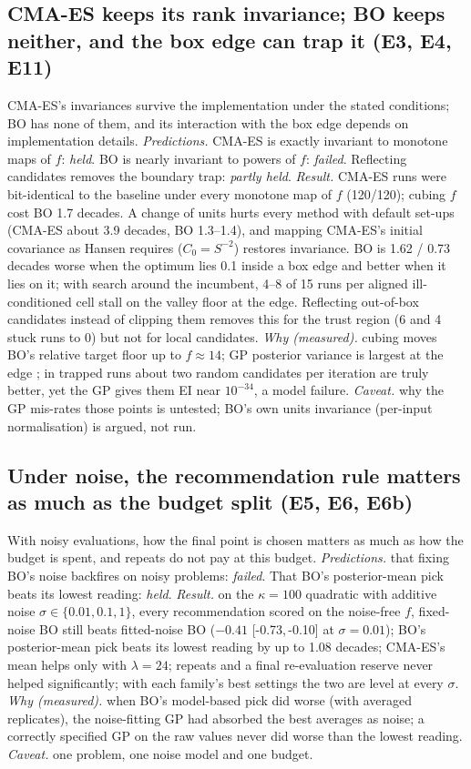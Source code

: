 \documentclass[10pt,a4paper]{article}
\newcommand{\ci}[2]{[#1,\,#2]}
\begin{document}
\subsection{CMA-ES keeps its rank invariance; BO keeps neither, and the box edge can trap it (E3, E4, E11)}
CMA-ES's invariances survive the implementation under the stated conditions; BO has none of them, and its interaction with
the box edge depends on implementation details. \textit{Predictions.} CMA-ES is exactly invariant to monotone maps of
$f$: \emph{held}. BO is nearly invariant to powers of $f$: \emph{failed}. Reflecting candidates removes the boundary trap:
\emph{partly held}. \textit{Result.} CMA-ES runs were bit-identical to the baseline under every monotone map of $f$
(120/120); cubing $f$ cost BO 1.7 decades. A change of units hurts every method with default set-ups (CMA-ES about 3.9 decades, BO
1.3--1.4), and mapping CMA-ES's initial covariance as Hansen requires ($C_0=S^{-2}$) restores invariance. BO is 1.62 / 0.73
decades worse when the optimum lies 0.1 inside a box edge and better when it lies on it; with search around the incumbent, 4--8 of
15 runs per aligned ill-conditioned cell stall on the valley floor at the edge. Reflecting out-of-box candidates instead of clipping
them removes this for the trust region (6 and 4 stuck runs to 0) but not for local candidates. \textit{Why (measured).} cubing
moves BO's relative target floor up to $f\approx14$; GP posterior variance is largest at the edge \citep{siivola2018boundary}; in
trapped runs about two random candidates per iteration are truly better, yet the GP gives them EI near $10^{-34}$, a model failure.
\textit{Caveat.} why the GP mis-rates those points is untested; BO's own units invariance (per-input normalisation) is
argued, not run.

\subsection{Under noise, the recommendation rule matters as much as the budget split (E5, E6, E6b)}
With noisy evaluations, how the final point is chosen matters as much as how the budget is spent, and repeats do not pay at this
budget. \textit{Predictions.} that fixing BO's noise backfires on noisy problems: \emph{failed}. That BO's
posterior-mean pick beats its lowest reading: \emph{held}. \textit{Result.} on the $\kappa=100$ quadratic with additive
noise $\sigma\in\{0.01,0.1,1\}$, every recommendation scored on the noise-free $f$, fixed-noise BO still beats fitted-noise BO
($-0.41$ \ci{-0.73}{-0.10} at $\sigma=0.01$); BO's posterior-mean pick beats its lowest reading by up to 1.08 decades; CMA-ES's mean
helps only with $\lambda=24$; repeats and a final re-evaluation reserve never helped significantly; with each family's best
settings the two are level at every $\sigma$. \textit{Why (measured).} when BO's model-based pick did worse (with averaged
replicates), the noise-fitting GP had absorbed the best averages as noise; a correctly specified GP on the raw values never did worse
than the lowest reading. \textit{Caveat.} one problem, one noise model and one budget.
\end{document}
